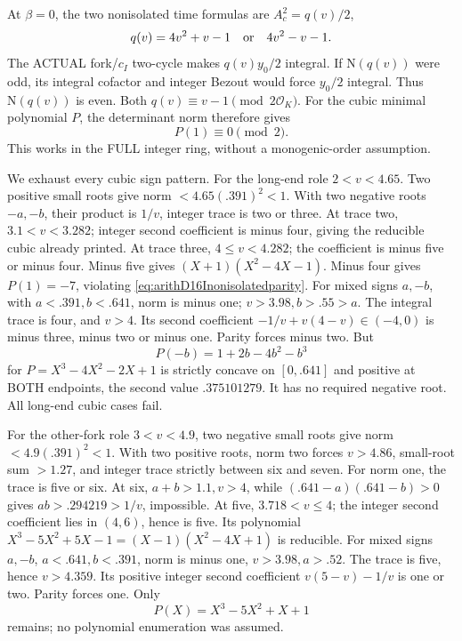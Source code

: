 At \(\beta=0\), the two nonisolated
time formulas are \(A_c^2=q(v)/2\),
\[
                     q(v)=4v^2+v-1\quad\hbox{or}\quad4v^2-v-1 .
\]
The ACTUAL fork/\(c_I\) two-cycle
makes \(q(v)y_0/2\) integral.
If \(\mathrm N(q(v))\) were odd,
its integral cofactor and integer
Bezout would force \(y_0/2\) integral.
Thus \(\mathrm N(q(v))\) is even.
Both \(q(v)\equiv v-1\pmod{2\mathcal O_K}\).
For the cubic minimal polynomial \(P\),
the determinant norm therefore gives
\[
                                      P(1)\equiv0\pmod2 .
\tag{D16Iparity}\label{eq:arithD16Inonisolatedparity}
\]
This works in the FULL integer ring,
without a monogenic-order assumption.

We exhaust every cubic sign pattern.
For the long-end role \(2<v<4.65\).
Two positive small roots give norm
\(<4.65(.391)^2<1\).
With two negative roots \(-a,-b\),
their product is \(1/v\), integer trace
is two or three.
At trace two, \(3.1<v<3.282\);
integer second coefficient is minus four,
giving the reducible cubic already printed.
At trace three, \(4\le v<4.282\);
the coefficient is minus five or minus
four.
Minus five gives
\((X+1)(X^2-4X-1)\).
Minus four gives \(P(1)=-7\), violating
\eqref{eq:arithD16Inonisolatedparity}.
For mixed signs \(a,-b\), with
\(a<.391,b<.641\), norm is minus one;
\(v>3.98,b>.55>a\).
The integral trace is four, and
\(v>4\).
Its second coefficient
\(-1/v+v(4-v)\in(-4,0)\)
is minus three, minus two or minus one.
Parity forces minus two.
But
\[
 P(-b)=1+2b-4b^2-b^3
\]
for \(P=X^3-4X^2-2X+1\) is strictly
concave on \([0,.641]\) and positive
at BOTH endpoints, the second value
\(.375101279\).
It has no required negative root.
All long-end cubic cases fail.

For the other-fork role \(3<v<4.9\),
two negative small roots give norm
\(<4.9(.391)^2<1\).
With two positive roots, norm two
forces \(v>4.86\), small-root sum
\(>1.27\), and integer trace strictly
between six and seven.
For norm one, the trace is five or six.
At six, \(a+b>1.1,v>4\), while
\((.641-a)(.641-b)>0\) gives
\(ab>.294219>1/v\), impossible.
At five, \(3.718<v\le4\);
the integer second coefficient lies
in \((4,6)\), hence is five.
Its polynomial
\(X^3-5X^2+5X-1=(X-1)(X^2-4X+1)\)
is reducible.
For mixed signs \(a,-b\),
\(a<.641,b<.391\), norm is minus one,
\(v>3.98,a>.52\).
The trace is five, hence \(v>4.359\).
Its positive integer second coefficient
\(v(5-v)-1/v\) is one or two.
Parity forces one.
Only
\[
                                      P(X)=X^3-5X^2+X+1
\]
remains; no polynomial enumeration
was assumed.

